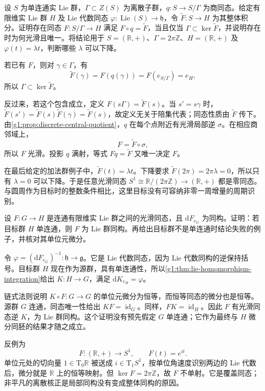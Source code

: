\begin{exercise}\label{g1:ex:lie-homomorphism-descent}
	设 \(S\) 为单连通实 Lie 群，\(\Gamma\subset Z(S)\) 为离散子群，\(q:S\to S/\Gamma\) 为商同态。给定有限维实 Lie 群 \(H\) 及 Lie 代数同态 \(\varphi:\operatorname{Lie}(S)\to\mathfrak h\)，令 \(\widetilde F:S\to H\) 为其整体积分。证明存在同态 \(F:S/\Gamma\to H\) 满足 \(F\circ q=\widetilde F\)，当且仅当 \(\Gamma\subset\ker\widetilde F\)，并说明存在时为何光滑且唯一。将结论用于 \(S=(\mathbb R,+)\)、\(\Gamma=2\pi\mathbb Z\)、\(H=(\mathbb R,+)\) 及 \(\varphi(t)=\lambda t\)，判断哪些 \(\lambda\) 可以下降。
\end{exercise}
\begin{solution}
	若已有 \(F\)，则对 \(\gamma\in\Gamma\)，有
	\[
		\widetilde F(\gamma)=F(q(\gamma))=F(e_{S/\Gamma})=e_H,
	\]
	所以 \(\Gamma\subset\ker\widetilde F\)。

	反过来，若这个包含成立，定义 \(F(s\Gamma)=\widetilde F(s)\)。当 \(s'=s\gamma\) 时，
	\(\widetilde F(s')=\widetilde F(s)\widetilde F(\gamma)=\widetilde F(s)\)，故定义无关于陪集代表；同态性质由 \(\widetilde F\) 传下。由\cref{g1:prop:discrete-central-quotient}，\(q\) 在每个点附近有光滑局部逆 \(\sigma\)。在相应商邻域上，
	\[
		F=\widetilde F\circ\sigma,
	\]
	所以 \(F\) 光滑。投影 \(q\) 满射，等式 \(Fq=\widetilde F\) 又唯一决定 \(F\)。

	在最后给定的加法群例子中，\(\widetilde F(t)=\lambda t\)。下降要求 \(\widetilde F(2\pi)=2\pi\lambda=0\)，所以只有 \(\lambda=0\) 可以下降。于是任意光滑同态 \(S^1\cong\mathbb R/(2\pi\mathbb Z)\to(\mathbb R,+)\) 都是零同态。与圆周作为目标时的整数条件相比，这里目标没有可容纳非零一周增量的周期识别。
\end{solution}

\begin{exercise}\label{g1:ex:local-isomorphism-simply-connected-target}
	设 \(F:G\to H\) 是连通有限维实 Lie 群之间的光滑同态，且 \(\mathrm{d}F_{e_G}\) 为同构。证明：若目标群 \(H\) 单连通，则 \(F\) 为 Lie 群同构。再给出目标群不是单连通时结论失败的例子，并核对其单位元微分。
\end{exercise}
\begin{solution}
	令 \(\varphi=(\mathrm{d}F_{e_G})^{-1}:\mathfrak h\to\mathfrak g\)。它是 Lie 代数同态，因为 Lie 代数同构的逆保持括号。目标群 \(H\) 现在作为源群，具有单连通性，所以\cref{g1:thm:lie-homomorphism-integration}给出 \(K:H\to G\)，满足 \(\mathrm{d}K_{e_H}=\varphi\)。

	链式法则说明 \(K\circ F:G\to G\) 的单位元微分为恒等，而恒等同态的微分也是恒等。源群 \(G\) 连通，同态唯一性给出 \(KF=\operatorname{id}_G\)。同样，\(FK=\operatorname{id}_H\)。因此 \(F\) 有光滑同态逆 \(K\)，为 Lie 群同构。这个证明没有预先假定 \(G\) 单连通；它作为最终与 \(H\) 微分同胚的结果才随之成立。

	反例为
	\[
		F:(\mathbb R,+)\longrightarrow S^1,\qquad F(t)=e^{it}.
	\]
	单位元处的切向量 \(1\in \mathrm{T}_0\mathbb R\) 被送成 \(i\in \mathrm{T}_1S^1\)，按单位角速度识别两边的 Lie 代数后，微分就是 \(\mathbb R\) 上的恒等映射。但 \(\ker F=2\pi\mathbb Z\)，故 \(F\) 不单射。它是覆盖同态；非平凡的离散核正是局部同构没有变成整体同构的原因。
\end{solution}
